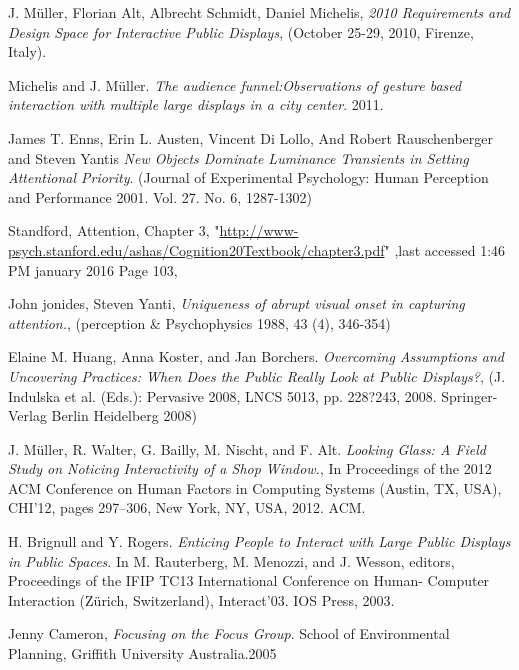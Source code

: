 \begin{thebibliography}{9}


J. Müller, Florian Alt, Albrecht Schmidt, Daniel Michelis, 
 \emph{2010 Requirements and Design Space for Interactive Public Displays},
 (October 25-29, 2010, Firenze, Italy). 
 
Michelis and J. Müller.
\emph{The audience funnel:Observations of gesture based interaction with multiple large displays in a city center}.
 2011.

James T. Enns, Erin L. Austen, Vincent Di Lollo, And Robert Rauschenberger and Steven Yantis 
\emph{New Objects Dominate Luminance Transients in Setting Attentional Priority}.
 (Journal of Experimental Psychology: Human Perception and Performance 2001. Vol. 27. No. 6, 1287-1302) 

Standford, Attention, Chapter 3,
"\url{http://www-psych.stanford.edu/ashas/Cognition20Textbook/chapter3.pdf}"
,last accessed 1:46 PM january 2016 Page 103, 
 
John jonides, Steven Yanti, 
\emph{Uniqueness of abrupt visual onset in capturing attention.},
(perception \& Psychophysics 1988, 43 (4), 346-354) 

Elaine M. Huang, Anna Koster, and Jan Borchers. 
\emph{Overcoming Assumptions and Uncovering Practices: When Does the Public Really Look at Public Displays?},
(J. Indulska et al. (Eds.): Pervasive 2008, LNCS 5013, pp. 228?243, 2008. Springer-Verlag Berlin Heidelberg 2008) 

J. Müller, R. Walter, G. Bailly, M. Nischt, and F. Alt. 
\emph{Looking Glass: A Field Study on Noticing Interactivity of a Shop Window.},
In Proceedings of the 2012 ACM Conference on Human Factors in Computing Systems (Austin, TX, USA), CHI’12, pages 297–306, New York, NY, USA, 2012. ACM.

H. Brignull and Y. Rogers. 
\emph{Enticing People to Interact with Large Public Displays in Public Spaces}. 
In M. Rauterberg, M. Menozzi, and J. Wesson, editors, Proceedings of the IFIP TC13 International Conference on Human- Computer Interaction (Zürich, Switzerland), Interact’03. IOS Press, 2003.

Jenny Cameron,
\emph{Focusing on the Focus Group}. 
School of Environmental Planning, Griffith University Australia.2005





















\end{thebibliography}